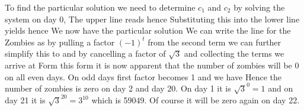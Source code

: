 \solution
To find the particular solution we need to determine $c_1$ and $c_2$ by solving the system on day 0,
The upper line reads 
hence 
Substituting this into the lower line yields
hence 
We now have the particular solution 
We can write the line for the Zombies as
by pulling a factor $(-1)^t$ from the second term we can further simplify this to 
and by cancelling a factor of $\sqrt{3}$ and collecting the terms we arrive at 
Form this form it is now apparent that the number of zombies will be 0 on all even days. On odd days first factor becomes 1 and we have 
Hence the number of zombies is zero on day 2 and day 20. On day 1 it is $\sqrt{3}^0=1$ and on day 21 it is $\sqrt{3}^20 =3^10$ which is 59049. Of course it will be zero again on day 22. 
